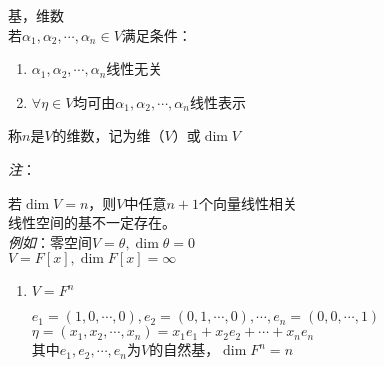 \begin{property}[线性空间的性质]
    \begin{definition}{基，维数}\\
        若$\alpha_1, \alpha_2, \cdots, \alpha_n \in V$满足条件：
        \begin{enumerate}
            \item $\alpha_1, \alpha_2, \cdots, \alpha_n$线性无关
            \item $\forall \eta \in V$均可由$\alpha_1, \alpha_2, \cdots, \alpha_n$线性表示
        \end{enumerate}
        称$n$是$V$的维数，记为维（$V$）或$\dim V$
    \end{definition}
    
    \emph{注}：
    \begin{proposition}
        若$\dim V = n$，则$V$中任意$n+1$个向量线性相关\\
        线性空间的基不一定存在。\\
        \emph{例如}：零空间$V = {\theta}, \dim{\theta} = 0$\\
        $V = F[x], \dim F[x] = \infty$
    \end{proposition}

    \begin{example}
        \begin{enumerate}
            \item $V = F^n$
            \begin{solutiontitle}
                $e_1 = (1, 0, \cdots, 0), e_2 = (0, 1, \cdots, 0), \cdots, e_n = (0, 0, \cdots, 1)$\\
                $\eta = (x_1, x_2, \cdots, x_n) = x_1e_1 + x_2e_2 + \cdots + x_ne_n$\\
                其中$e_1, e_2, \cdots, e_n$为$V$的自然基，$\dim F^n = n$
            \end{solutiontitle}


\end{enumerate}
\end{example}
\end{property}
